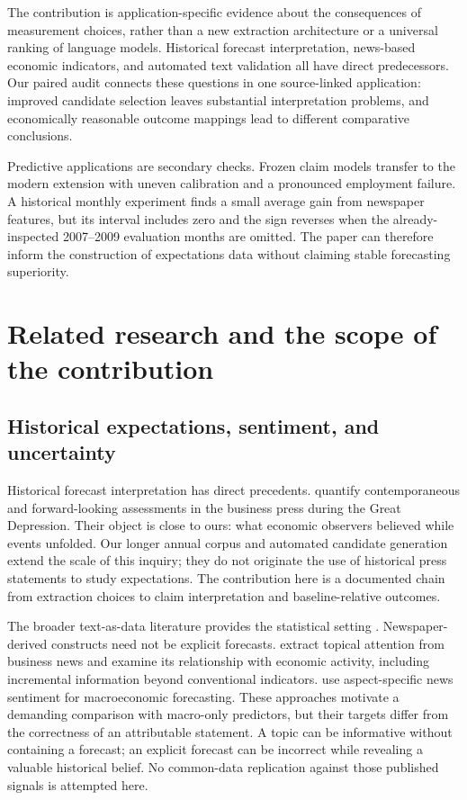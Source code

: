 \documentclass[iicol,pdflatex,sn-mathphys-num]{sn-jnl}
\begin{document}
The contribution is application-specific evidence about the consequences of measurement choices, rather than a new extraction architecture or a universal ranking of language models. Historical forecast interpretation, news-based economic indicators, and automated text validation all have direct predecessors. Our paired audit connects these questions in one source-linked application: improved candidate selection leaves substantial interpretation problems, and economically reasonable outcome mappings lead to different comparative conclusions.

Predictive applications are secondary checks. Frozen claim models transfer to the modern extension with uneven calibration and a pronounced employment failure. A historical monthly experiment finds a small average gain from newspaper features, but its interval includes zero and the sign reverses when the already-inspected 2007--2009 evaluation months are omitted. The paper can therefore inform the construction of expectations data without claiming stable forecasting superiority.

\section{Related research and the scope of the contribution}
\subsection{Historical expectations, sentiment, and uncertainty}
Historical forecast interpretation has direct precedents. \citet{mathy2017} quantify contemporaneous and forward-looking assessments in the business press during the Great Depression. Their object is close to ours: what economic observers believed while events unfolded. Our longer annual corpus and automated candidate generation extend the scale of this inquiry; they do not originate the use of historical press statements to study expectations. The contribution here is a documented chain from extraction choices to claim interpretation and baseline-relative outcomes.

The broader text-as-data literature provides the statistical setting \citep{gentzkow2019}. Newspaper-derived constructs need not be explicit forecasts. \citet{bybee2024} extract topical attention from business news and examine its relationship with economic activity, including incremental information beyond conventional indicators. \citet{barbaglia2022} use aspect-specific news sentiment for macroeconomic forecasting. These approaches motivate a demanding comparison with macro-only predictors, but their targets differ from the correctness of an attributable statement. A topic can be informative without containing a forecast; an explicit forecast can be incorrect while revealing a valuable historical belief. No common-data replication against those published signals is attempted here.
\end{document}
